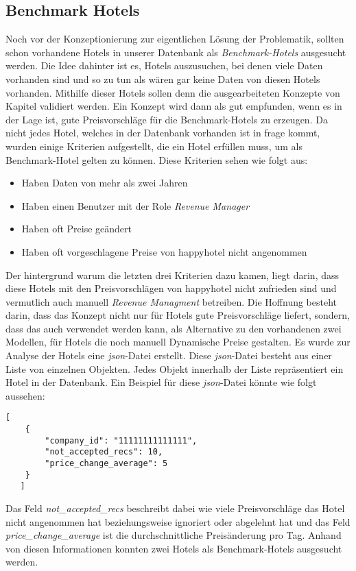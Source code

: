 \subsection{Benchmark Hotels}
\label{subsec:bench_hotels}
Noch vor der Konzeptionierung zur eigentlichen Lösung der Problematik, sollten schon vorhandene Hotels in unserer Datenbank als \emph{Benchmark-Hotels} ausgesucht werden. Die Idee dahinter ist es, Hotels auszusuchen, bei denen viele Daten vorhanden sind und so zu tun als wären gar keine Daten von diesen Hotels vorhanden. Mithilfe dieser Hotels sollen denn die ausgearbeiteten Konzepte von Kapitel \emph{} validiert werden. Ein Konzept wird dann als gut empfunden, wenn es in der Lage ist, gute Preisvorschläge für die Benchmark-Hotels zu erzeugen.
\newline
\newline
Da nicht jedes Hotel, welches in der Datenbank vorhanden ist in frage kommt, wurden einige Kriterien aufgestellt, die ein Hotel erfüllen muss, um als Benchmark-Hotel gelten zu können. Diese Kriterien sehen wie folgt aus:

\begin{itemize}
    \item Haben Daten von mehr als zwei Jahren
    \item Haben einen Benutzer mit der Role \emph{Revenue Manager}
    \item Haben oft Preise geändert
    \item Haben oft vorgeschlagene Preise von happyhotel nicht angenommen
\end{itemize}

Der hintergrund warum die letzten drei Kriterien dazu kamen, liegt darin, dass diese Hotels mit den Preisvorschlägen von happyhotel nicht zufrieden sind und vermutlich auch manuell \emph{Revenue Managment} betreiben. Die Hoffnung besteht darin, dass das Konzept nicht nur für Hotels gute Preisvorschläge liefert, sondern, dass das auch verwendet werden kann, als Alternative zu den vorhandenen zwei Modellen, für Hotels die noch manuell Dynamische Preise gestalten.
\newline
\newline
Es wurde zur Analyse der Hotels eine \emph{json}-Datei erstellt. Diese \emph{json}-Datei besteht aus einer Liste von einzelnen Objekten. Jedes Objekt innerhalb der Liste repräsentiert ein Hotel in der Datenbank. Ein Beispiel für diese \emph{json}-Datei könnte wie folgt aussehen:

\begin{lstlisting}[style=json, caption=Beispielhafte json-Datei,
    label=lst:json_file]
   [
    {
        "company_id": "11111111111111",
        "not_accepted_recs": 10,
        "price_change_average": 5
    }
   ]
\end{lstlisting}

Das Feld \emph{not\_accepted\_recs} beschreibt dabei wie viele Preisvorschläge das Hotel nicht angenommen hat beziehungsweise ignoriert oder abgelehnt hat und das Feld \emph{price\_change\_average} ist die durchschnittliche Preisänderung pro Tag. Anhand von diesen Informationen konnten zwei Hotels als Benchmark-Hotels ausgesucht werden.